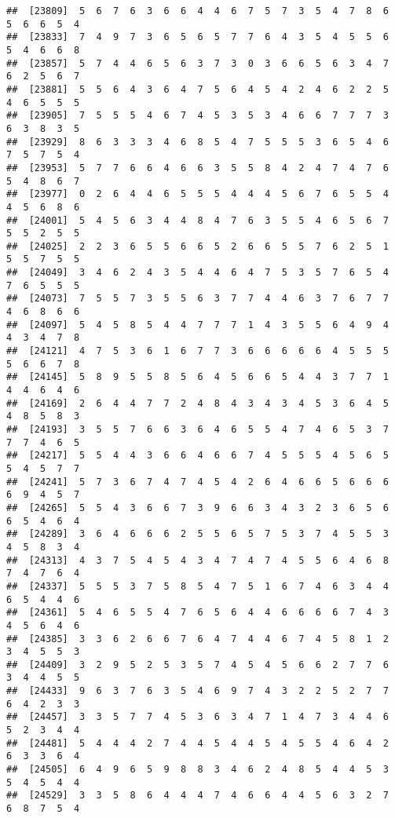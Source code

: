 \documentclass[
]{book}
\begin{document}
\begin{verbatim}
##  [23809]  5  6  7  6  3  6  6  4  4  6  7  5  7  3  5  4  7  8  6  5  6  6  5  4
##  [23833]  7  4  9  7  3  6  5  6  5  7  7  6  4  3  5  4  5  5  6  5  4  6  6  8
##  [23857]  5  7  4  4  6  5  6  3  7  3  0  3  6  6  5  6  3  4  7  6  2  5  6  7
##  [23881]  5  5  6  4  3  6  4  7  5  6  4  5  4  2  4  6  2  2  5  4  6  5  5  5
##  [23905]  7  5  5  5  4  6  7  4  5  3  5  3  4  6  6  7  7  7  3  6  3  8  3  5
##  [23929]  8  6  3  3  3  4  6  8  5  4  7  5  5  5  3  6  5  4  6  7  5  7  5  4
##  [23953]  5  7  7  6  6  4  6  6  3  5  5  8  4  2  4  7  4  7  6  5  4  8  6  7
##  [23977]  0  2  6  4  4  6  5  5  5  4  4  4  5  6  7  6  5  5  4  4  5  6  8  6
##  [24001]  5  4  5  6  3  4  4  8  4  7  6  3  5  5  4  6  5  6  7  5  5  2  5  5
##  [24025]  2  2  3  6  5  5  6  6  5  2  6  6  5  5  7  6  2  5  1  5  5  7  5  5
##  [24049]  3  4  6  2  4  3  5  4  4  6  4  7  5  3  5  7  6  5  4  7  6  5  5  5
##  [24073]  7  5  5  7  3  5  5  6  3  7  7  4  4  6  3  7  6  7  7  4  6  8  6  6
##  [24097]  5  4  5  8  5  4  4  7  7  7  1  4  3  5  5  6  4  9  4  4  3  4  7  8
##  [24121]  4  7  5  3  6  1  6  7  7  3  6  6  6  6  6  4  5  5  5  5  6  6  7  8
##  [24145]  5  8  9  5  5  8  5  6  4  5  6  6  5  4  4  3  7  7  1  4  4  6  4  6
##  [24169]  2  6  4  4  7  7  2  4  8  4  3  4  3  4  5  3  6  4  5  4  8  5  8  3
##  [24193]  3  5  5  7  6  6  3  6  4  6  5  5  4  7  4  6  5  3  7  7  7  4  6  5
##  [24217]  5  5  4  4  3  6  6  4  6  6  7  4  5  5  5  4  5  6  5  5  4  5  7  7
##  [24241]  5  7  3  6  7  4  7  4  5  4  2  6  4  6  6  5  6  6  6  6  9  4  5  7
##  [24265]  5  5  4  3  6  6  7  3  9  6  6  3  4  3  2  3  6  5  6  6  5  4  6  4
##  [24289]  3  6  4  6  6  6  2  5  5  6  5  7  5  3  7  4  5  5  3  4  5  8  3  4
##  [24313]  4  3  7  5  4  5  4  3  4  7  4  7  4  5  5  6  4  6  8  7  4  7  6  4
##  [24337]  5  5  5  3  7  5  8  5  4  7  5  1  6  7  4  6  3  4  4  6  5  4  4  6
##  [24361]  5  4  6  5  5  4  7  6  5  6  4  4  6  6  6  6  7  4  3  4  5  6  4  6
##  [24385]  3  3  6  2  6  6  7  6  4  7  4  4  6  7  4  5  8  1  2  3  4  5  5  3
##  [24409]  3  2  9  5  2  5  3  5  7  4  5  4  5  6  6  2  7  7  6  3  4  4  5  5
##  [24433]  9  6  3  7  6  3  5  4  6  9  7  4  3  2  2  5  2  7  7  6  4  2  3  3
##  [24457]  3  3  5  7  7  4  5  3  6  3  4  7  1  4  7  3  4  4  6  5  2  3  4  4
##  [24481]  5  4  4  4  2  7  4  4  5  4  4  5  4  5  5  4  6  4  2  6  3  3  6  4
##  [24505]  6  4  9  6  5  9  8  8  3  4  6  2  4  8  5  4  4  5  3  5  4  5  4  4
##  [24529]  3  3  5  8  6  4  4  4  7  4  6  6  4  4  5  6  3  2  7  6  8  7  5  4

\end{verbatim}
\end{document}
